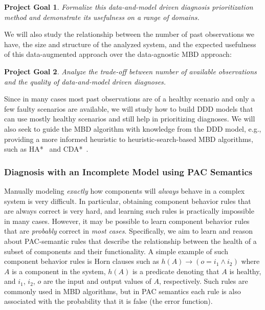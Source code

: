 \documentclass[12pt]{article}
\newtheorem{problem}{Project Goal}
\begin{document}
\begin{problem}
Formalize this data-and-model driven diagnosis prioritization method and demonstrate its usefulness on a range of domains. 
\end{problem}


We will also study the relationship between the number of past observations we have, the size and structure of the analyzed system, and the expected usefulness of this data-augmented approach over the data-agnostic MBD approach: 
\begin{problem}
Analyze the trade-off between number of available observations and the quality of data-and-model driven diagnoses.
\end{problem}
Since in many cases most past observations are of a healthy scenario and only a few faulty scenarios are available, we will study how to build DDD models that can use mostly healthy scenarios and still help in prioritizing diagnoses. We will also seek to guide the MBD algorithm with knowledge from the DDD model, e.g., providing a more informed heuristic to heuristic-search-based MBD algorithms, such as HA*~\cite{feldman2006two} and CDA*~\cite{williams2007conflict}. 



\subsubsection{Diagnosis with an Incomplete Model using PAC Semantics}

Manually modeling {\em exactly} how components will {\em always} behave in a complex system is very difficult. In particular, obtaining component behavior rules that are always correct is very hard, and learning such rules is practically impossible in many cases. However, it may be possible to learn component behavior rules that are {\em probably} correct in {\em most cases}. Specifically, we aim to learn and reason about PAC-semantic rules that describe the relationship between 
the health of a subset of components and their functionality. 
A simple example of such component behavior rules is Horn clauses such as $h(A)\rightarrow (o = i_1 \wedge i_2)$
where $A$ is a component in the system, $h(A)$ is a predicate denoting that $A$ is healthy, and $i_1$, $i_2$, $o$ are the input and output values of $A$, respectively. Such rules are commonly used in MBD algorithms,
but in PAC semantics each rule is also associated with the probability that it is false (the error function). 
\end{document}
